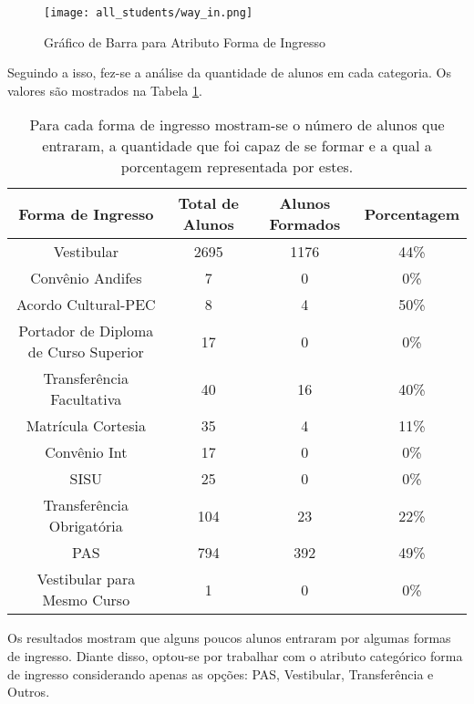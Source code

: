 \begin{figure}[!ht]
    \caption{Gráfico de Barra para Atributo Forma de Ingresso}
    \centering
    \texttt{[image: all\_students/way\_in.png]}
    \label{atr_way_in}
\end{figure}

Seguindo a isso, fez-se a análise da quantidade de alunos em cada categoria. Os
valores são mostrados na Tabela \ref{tab_way_in}.

\begin{table}
\begin{center}
\begin{tabular}[c]{| c | c | c | c |}
    \hline
    Forma de Ingresso & Total de Alunos & Alunos Formados & Porcentagem \\
    \hline
    Vestibular & 2695 & 1176 & 44\% \\
    \hline
    Convênio Andifes & 7 & 0 & 0\% \\
    \hline
    Acordo Cultural-PEC & 8 & 4 & 50\% \\
    \hline
    Portador de Diploma de Curso Superior & 17 & 0 & 0\% \\
    \hline
    Transferência Facultativa & 40 & 16 & 40\% \\
    \hline
    Matrícula Cortesia & 35 & 4 & 11\% \\
    \hline
    Convênio Int & 17 & 0 & 0\% \\
    \hline
    SISU & 25 & 0 & 0\% \\
    \hline
    Transferência Obrigatória & 104 & 23 & 22\% \\
    \hline
    PAS & 794 & 392 & 49\% \\
    \hline
    Vestibular para Mesmo Curso & 1 & 0 & 0\% \\
    \hline
\end{tabular}
\end{center}
\caption{Para cada forma de ingresso mostram-se o número de alunos que
entraram, a quantidade que foi capaz de se formar e a qual a porcentagem representada
por estes.}
\label{tab_way_in}
\end{table}

Os resultados mostram que alguns poucos alunos entraram por algumas formas de
ingresso. Diante disso, optou-se por trabalhar com o atributo categórico forma de
ingresso considerando apenas as opções: PAS, Vestibular, Transferência e Outros. 
 
